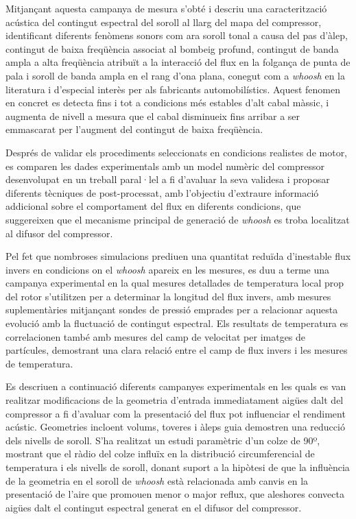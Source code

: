 Mitjançant aquesta campanya de mesura s'obté i descriu una caracterització acústica del contingut espectral del soroll al llarg del mapa del compressor, identificant diferents fenòmens sonors com ara soroll tonal a causa del pas d'àlep, contingut de baixa freqüència associat al bombeig profund, contingut de banda ampla a alta freqüència atribuït a la interacció del flux en la folgança de punta de pala i soroll de banda ampla en el rang d'ona plana, conegut com a \emph{whoosh} en la literatura i d'especial interès per als fabricants automobilístics. Aquest fenomen en concret es detecta fins i tot a condicions més estables d'alt cabal màssic, i augmenta de nivell a mesura que el cabal disminueix fins arribar a ser emmascarat per l'augment del contingut de baixa freqüència.

Després de validar els procediments seleccionats en condicions realistes de motor, es comparen les dades experimentals amb un model numèric del compressor desenvolupat en un treball paral·lel a fi d'avaluar la seva validesa i proposar diferents tècniques de post-processat, amb l'objectiu d'extraure informació addicional sobre el comportament del flux en diferents condicions, que suggereixen que el mecanisme principal de generació de \emph{whoosh} es troba localitzat al difusor del compressor.

Pel fet que nombroses simulacions prediuen una quantitat reduïda d'i\-nes\-ta\-ble flux invers en condicions on el \emph{whoosh} apareix en les mesures, es duu a terme una campanya experimental en la qual mesures detallades de temperatura local prop del rotor s'utilitzen per a determinar la longitud del flux invers, amb mesures suplementàries mitjançant sondes de pressió emprades per a relacionar aquesta evolució amb la fluctuació de contingut espectral. Els resultats de temperatura es correlacionen també amb mesures del camp de velocitat per imatges de partícules, demostrant una clara relació entre el camp de flux invers i les mesures de temperatura.

Es descriuen a continuació diferents campanyes experimentals en les quals es van realitzar modificacions de la geometria d'entrada immediatament aigües dalt del compressor a fi d'avaluar com la presentació del flux pot influenciar el rendiment acústic. Geometries incloent volums, toveres i àleps guia demostren una reducció dels nivells de soroll. S'ha realitzat un estudi paramètric d'un colze de 90º, mostrant que el ràdio del colze influïx en la distribució circumferencial de temperatura i els nivells de soroll, donant suport a la hipòtesi de que la influència de la geometria en el soroll de \emph{whoosh} està relacionada amb canvis en la presentació de l'aire que promouen menor o major reflux, que aleshores convecta aigües dalt el contingut espectral generat en el difusor del compressor.

\cleardoublepage